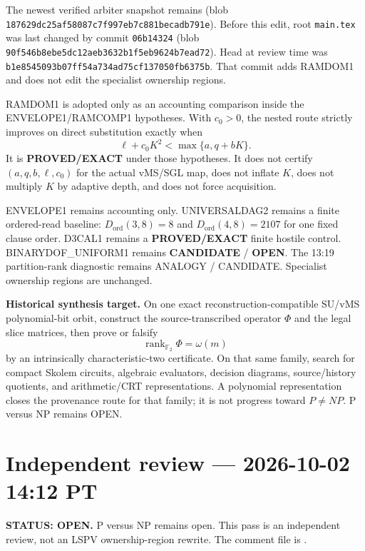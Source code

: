 \documentclass[11pt]{article}
\begin{document}
The newest verified arbiter snapshot remains
(blob \texttt{187629dc25af58087c7f997eb7c881becadb791e}).
Before this edit, root \texttt{main.tex} was last changed by commit \texttt{06b14324}
(blob \texttt{90f546b8ebe5dc12aeb3632b1f5eb9624b7ead72}). Head at review time was
\texttt{b1e8545093b07ff54a734ad75cf137050fb6375b}. That commit adds RAMDOM1 and does not edit
the specialist ownership regions.

RAMDOM1 is adopted only as an accounting comparison inside the ENVELOPE1/RAMCOMP1 hypotheses.
With \(c_0>0\), the nested route strictly improves on direct substitution exactly when
\[
\ell+c_0K^2<\max\{a,q+bK\}.
\]
It is \textbf{PROVED/EXACT} under those hypotheses. It does not certify \((a,q,b,\ell,c_0)\) for
the actual vMS/SGL map, does not inflate \(K\), does not multiply \(K\) by adaptive depth, and
does not force acquisition.

ENVELOPE1 remains accounting only. UNIVERSALDAG2 remains a finite ordered-read baseline:
\(D_{\mathrm{ord}}(3,8)=8\) and \(D_{\mathrm{ord}}(4,8)=2107\) for one fixed clause order.
D3CAL1 remains a \textbf{PROVED/EXACT} finite hostile control. BINARYDOF\_UNIFORM1 remains
\textbf{CANDIDATE} / \textbf{OPEN}. The 13:19 partition-rank diagnostic remains ANALOGY / CANDIDATE.
Specialist ownership regions are unchanged.

\begin{candidatebox}
\textbf{Historical synthesis target.}
On one exact reconstruction-compatible SU/vMS polynomial-bit orbit, construct the
source-transcribed operator \(\Phi\) and the legal slice matrices, then prove or falsify
\[
\operatorname{rank}_{\mathbb F_2}\Phi=\omega(m)
\]
by an intrinsically characteristic-two certificate. On that same family, search for compact
Skolem circuits, algebraic evaluators, decision diagrams, source/history quotients, and
arithmetic/CRT representations. A polynomial representation closes the provenance route for
that family; it is not progress toward \(P\neq NP\). P versus NP remains OPEN.
\end{candidatebox}


\section{Independent review --- 2026-10-02 14:12 PT}
\textbf{STATUS: OPEN.} P versus NP remains open. This pass is an independent review, not an
LSPV ownership-region rewrite. The comment file is
.
\end{document}
